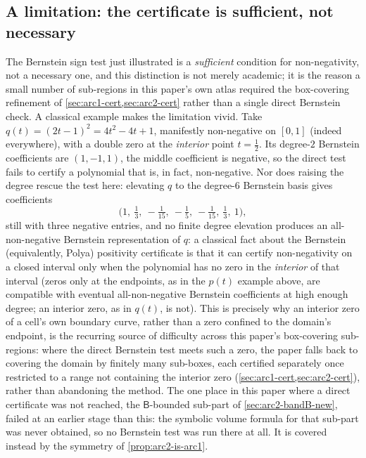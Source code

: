 \documentclass[11pt,reqno]{amsart}
\renewcommand{\_}{\origunderscore\allowbreak}
\numberwithin{equation}{section}
\theoremstyle{plain}
\theoremstyle{definition}
\theoremstyle{remark}
\begin{document}
\subsection{A limitation: the certificate is sufficient, not necessary}

The Bernstein sign test just illustrated is a \emph{sufficient} condition
for non-negativity, not a necessary one, and this distinction is not
merely academic; it is the reason a small number of sub-regions in this
paper's own atlas required the box-covering refinement of
\cref{sec:arc1-cert,sec:arc2-cert} rather than a single direct Bernstein
check. A classical example makes the limitation vivid. Take
$q(t)=(2t-1)^2=4t^2-4t+1$, manifestly non-negative on $[0,1]$ (indeed
everywhere), with a double zero at the \emph{interior} point $t=\tfrac12$.
Its degree-$2$ Bernstein coefficients are $(1,-1,1)$, the middle
coefficient is negative, so the direct test fails to certify a polynomial
that is, in fact, non-negative. Nor does raising the degree rescue the
test here: elevating $q$ to the degree-$6$ Bernstein basis gives
coefficients
\[
  \bigl(1,\ \tfrac13,\ -\tfrac1{15},\ -\tfrac15,\ -\tfrac1{15},\ \tfrac13,\ 1\bigr),
\]
still with three negative entries, and no finite degree elevation
produces an all-non-negative Bernstein representation of $q$: a classical
fact about the Bernstein (equivalently, Polya) positivity certificate is
that it can certify non-negativity on a closed interval only when the
polynomial has no zero in the \emph{interior} of that interval (zeros
only at the endpoints, as in the $p(t)$ example above, are compatible with
eventual all-non-negative Bernstein coefficients at high enough degree;
an interior zero, as in $q(t)$, is not). This is precisely why an interior
zero of a cell's own boundary curve, rather than a zero confined to the
domain's endpoint, is the recurring source of difficulty across this
paper's box-covering sub-regions: where the direct Bernstein test meets
such a zero, the paper falls back to covering the domain by finitely many
sub-boxes, each certified separately once restricted to a range not
containing the interior zero (\cref{sec:arc1-cert,sec:arc2-cert}), rather
than abandoning the method. The one place in this paper where a direct
certificate was not reached, the $\mathsf B$-bounded sub-part of
\cref{sec:arc2-bandB-new}, failed at an earlier stage than this: the
symbolic volume formula for that sub-part was never obtained, so no
Bernstein test was run there at all. It is covered instead by the
symmetry of \cref{prop:arc2-is-arc1}.
\end{document}
